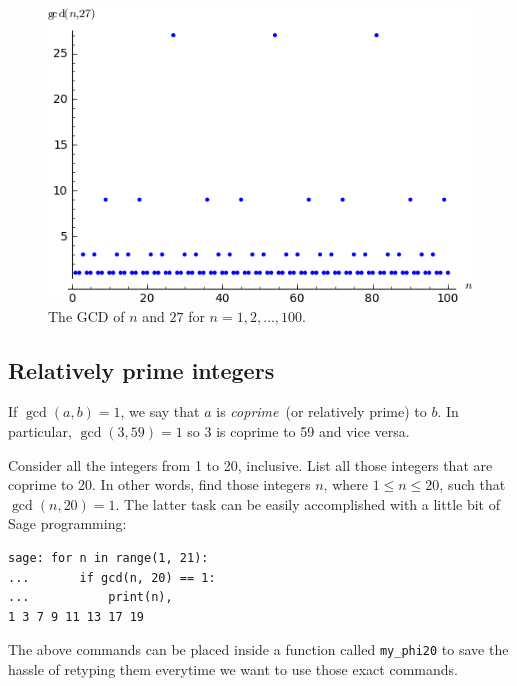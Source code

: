 \begin{figure}[!htbp]
\centering
\includegraphics[scale=1.0]{images/gcd-100}
\caption{The GCD of $n$ and $27$ for $n = 1, 2, \dots, 100$.}
\label{fig:number_theory:gcd_n_27}
\end{figure}



\subsection{Relatively prime integers}

If $\gcd(a,b) = 1$, we say that $a$ is \emph{coprime}~(or relatively
prime) to $b$.  In particular, $\gcd(3, 59) = 1$ so 3 is coprime to 59
and vice versa.

Consider all the integers from 1 to 20, inclusive.  List all those
integers that are coprime to 20.  In other words, find those integers
$n$, where $1 \leq n \leq 20$, such that $\gcd(n,20) = 1$. The latter
task can be easily accomplished with a little bit of Sage programming:

\begin{lstlisting}
sage: for n in range(1, 21):
...       if gcd(n, 20) == 1:
...           print(n),
1 3 7 9 11 13 17 19
\end{lstlisting}

The above commands can be placed inside a function called
\verb!my_phi20! to save the hassle of retyping them everytime we want
to use those exact commands.

